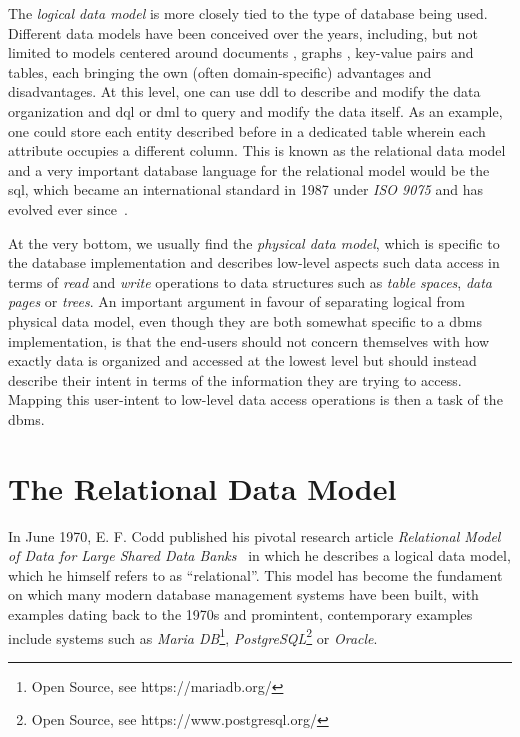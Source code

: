 The \emph{logical data model} is more closely tied to the type of database being used. Different data models have been conceived over the years, including, but not limited to models centered around documents \cite{Hashem:2016Evaluating}, graphs \cite{Angles:2008Survey}, key-value pairs and tables, each bringing the own (often domain-specific) advantages and disadvantages. At this level, one can use \acrshort{ddl} to describe and modify the data organization and \acrshort{dql} or \acrshort{dml} to query and modify the data itself. As an example, one could store each entity described before in a dedicated table wherein each attribute occupies a different column. This is known as the relational data model \cite{Codd:1970Relational} and a very important database language for the relational model would be the \acrfull{sql}, which became an international standard in 1987 under \emph{ISO 9075} and has evolved ever since~\cite{Chamberlin:2012Early}.

At the very bottom, we usually find the \emph{physical data model}, which is specific to the database implementation and describes low-level aspects such data access in terms of \emph{read} and \emph{write} operations to data structures such as \emph{table spaces}, \emph{data pages} or \emph{trees}. An important argument in favour of separating logical from physical data model, even though they are both somewhat specific to a \acrshort{dbms} implementation, is that the end-users should not concern themselves with how exactly data is organized and accessed at the lowest level but should instead describe their intent in terms of the information they are trying to access. Mapping this user-intent to low-level data access operations is then a task of the \acrshort{dbms}.

\section{The Relational Data Model}
\label{section:relational_data_model}

In June 1970, E. F. Codd published his pivotal research article \emph{Relational Model of Data for Large Shared Data Banks}~\cite{Codd:1970Relational} in which he describes a logical data model, which he himself refers to as ``relational''. This model has become the fundament on which many modern database management systems have been built, with examples dating back to the 1970s \cite{Astrahan:1976Systemr} and promintent, contemporary examples include systems such as \emph{Maria DB}\footnote{Open Source, see https://mariadb.org/}, \emph{PostgreSQL}\footnote{Open Source, see https://www.postgresql.org/} or \emph{Oracle}. 

